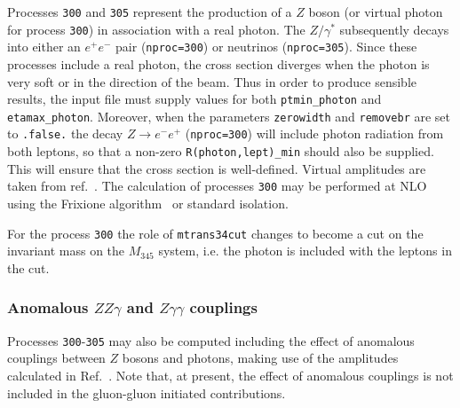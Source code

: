 \documentclass[12pt]{article}
\begin{document}
Processes {\tt 300} and {\tt 305} represent the production of a $Z$ boson (or virtual photon for process {\tt 300})
in association with a real photon. The $Z/\gamma^*$ subsequently decays into 
either an $e^+ e^-$ pair ({\tt nproc=300}) or neutrinos ({\tt nproc=305}).
Since these processes include a real photon, the cross section diverges
when the photon is very soft or in the direction of the beam.
Thus in order to produce sensible results, the input file must supply values for both
{\tt ptmin\_photon} and {\tt etamax\_photon}. Moreover, when the parameters {\tt zerowidth}
and {\tt removebr} are set to {\tt .false.} the decay $Z \to e^- e^+$ ({\tt nproc=300})
will include photon radiation from both leptons, so that a non-zero {\tt R(photon,lept)\_min}
should also be supplied. This will ensure that the cross section is well-defined.
Virtual amplitudes are taken from ref.~\cite{Dixon:1998py}.
The calculation of processes {\tt 300} may be performed
at NLO using the Frixione algorithm~\cite{Frixione:1998jh} or standard isolation. 

For the process {\tt 300}  the role of {\tt mtrans34cut} changes to become a cut 
on the invariant mass on the $M_{345}$ system, i.e. the photon is included with the leptons in the cut. 

\subsubsection{Anomalous $ZZ\gamma$ and $Z\gamma\gamma$ couplings}
Processes {\tt 300}-{\tt 305} may also be computed including the effect of anomalous couplings between $Z$ bosons
and photons, making use of the amplitudes calculated in Ref.~\cite{DeFlorian:2000sg}.
Note that, at present, the effect of anomalous couplings is not included in the gluon-gluon
initiated contributions.
\end{document}
